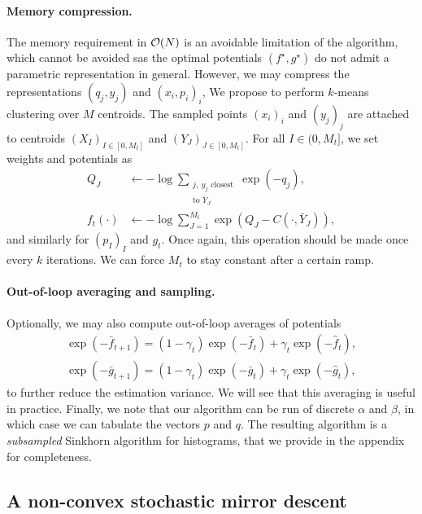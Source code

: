 \paragraph{Memory compression.} The memory requirement in $\mathcal{O}(N)$ is an
avoidable limitation of the algorithm, which cannot be avoided sas the optimal
potentials $(f^\star, g^\star)$ do not admit a parametric representation in
general. However, we may compress the representations $(q_j, y_j)$ and $(x_i,
p_i)_i$, We propose to perform $k$-means clustering over $M$ centroids. The
sampled points $(x_i)_i$ and $(y_j)_j$ are attached to centroids ${(X_I)}_{I \in
[0,M_t]}$ and ${(Y_J)}_{J \in [0,M_t]}$. For all $I \in (0, M_t]$, we set
weights and potentials as
\begin{align}
    Q_J &\gets - \log \sum_{\substack{j,\:y_j \text{ closest}\\\text{to } \bar Y_J}}
     \exp(-q_j),\\
    f_t(\cdot) &\gets - \log\sum_{J=1}^{M_t} \exp(Q_J - C(\cdot, \bar Y_J)),
\end{align}
and similarly for $(p_I)_I$ and $g_t$. Once again, this operation should be made
once every $k$ iterations. We can force $M_t$ to stay constant after a certain
ramp.

\paragraph{Out-of-loop averaging and sampling.} Optionally, we may also
compute out-of-loop averages of potentials
\begin{align}
    \exp(-\bar f_{t+1}) = (1 - \gamma_t) \exp(-\bar f_t) + \gamma_t \exp(-\hat f_t), \\
    \exp(-\bar g_{t+1}) = (1 - \gamma_t) \exp(-\bar g_t) + \gamma_t \exp(-\hat g_t),
\end{align}
to further reduce the estimation variance. We will see that this averaging is
useful in practice. Finally, we note that our algorithm can be run of discrete
$\alpha$ and $\beta$, in which case we can tabulate the vectors $p$ and $q$. The resulting
algorithm is a \textit{subsampled} Sinkhorn algorithm for histograms, that we provide in the
appendix for completeness.

\subsection{A non-convex stochastic mirror descent}

